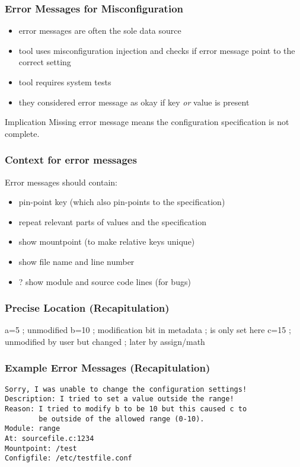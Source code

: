 \begin{frame}
	\frametitle{Error Messages for Misconfiguration~\cite{zhang2015proactive}}

	\begin{itemize}[<+-| alert@+>]
	\item error messages are often the sole data source
	\item tool uses misconfiguration injection and checks if error message point to the correct setting
	\item tool requires system tests
	\item they considered error message as okay if key \emph{or} value is present
	\end{itemize}

	\begin{alertblock}{Implication}
	Missing error message means the configuration specification is not complete.
	\end{alertblock}
\end{frame}

\begin{frame}
	\frametitle{Context for error messages}

	Error messages should contain:

	\begin{itemize}[<+-| alert@+>]
	\item pin-point key (which also pin-points to the specification)
	\item repeat relevant parts of values and the specification
	\item show mountpoint (to make relative keys unique)
	\item show file name and line number
	\item ? show module and source code lines (for bugs)
	\end{itemize}
\end{frame}

\begin{frame}[fragile]
	\frametitle{Precise Location (Recapitulation)}

	\begin{code}[language=CfgElektra,gobble=4]
	a=5  ; unmodified
	b=10 ; modification bit in metadata
	     ; is only set here
	c=15 ; unmodified by user but changed
	     ; later by assign/math
	\end{code}
\end{frame}

\begin{frame}[fragile]
	\frametitle{Example Error Messages (Recapitulation)}
\begin{verbatim}
Sorry, I was unable to change the configuration settings!
Description: I tried to set a value outside the range!
Reason: I tried to modify b to be 10 but this caused c to
        be outside of the allowed range (0-10).
Module: range
At: sourcefile.c:1234
Mountpoint: /test
Configfile: /etc/testfile.conf
\end{verbatim}
\end{frame}





